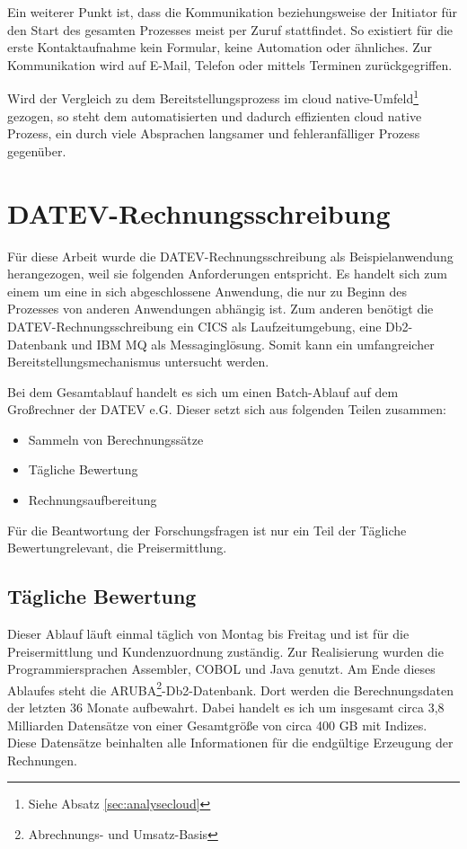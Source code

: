 Ein weiterer Punkt ist, dass die Kommunikation beziehungsweise der Initiator für den Start des gesamten Prozesses meist per Zuruf stattfindet.
So existiert für die erste Kontaktaufnahme kein Formular, keine Automation oder ähnliches.
Zur Kommunikation wird auf E-Mail, Telefon oder mittels Terminen zurückgegriffen.

Wird der Vergleich zu dem Bereitstellungsprozess im cloud native-Umfeld\footnote{Siehe Absatz \ref{sec:analysecloud}} gezogen, so steht dem automatisierten und dadurch effizienten cloud native Prozess, ein durch viele Absprachen langsamer und fehleranfälliger Prozess gegenüber.

\section{DATEV-Rechnungsschreibung}\label{rechBesch}
Für diese Arbeit wurde die DATEV-Rechnungsschreibung als Beispielanwendung herangezogen, weil sie folgenden Anforderungen entspricht.
Es handelt sich zum einem um eine in sich abgeschlossene Anwendung, die nur zu Beginn des Prozesses von anderen Anwendungen abhängig ist.
Zum anderen benötigt die DATEV-Rechnungsschreibung ein CICS als Laufzeitumgebung, eine Db2-Datenbank und IBM MQ als Messaginglösung.
Somit kann ein umfangreicher Bereitstellungsmechanismus untersucht werden.

Bei dem Gesamtablauf handelt es sich um einen Batch-Ablauf auf dem Großrechner der DATEV e.G.
Dieser setzt sich aus folgenden Teilen zusammen:
\begin{itemize}
\item Sammeln von Berechnungssätze
\item Tägliche Bewertung
\item Rechnungsaufbereitung
\end{itemize}
Für die Beantwortung der Forschungsfragen ist nur ein Teil der \glqq Tägliche Bewertung\grqq relevant, die Preisermittlung.

\subsection{Tägliche Bewertung}\label{sssec:täglbew}
Dieser Ablauf läuft einmal täglich von Montag bis Freitag und ist für die Preisermittlung und Kundenzuordnung zuständig.
Zur Realisierung wurden die Programmiersprachen Assembler, COBOL und Java genutzt.
Am Ende dieses Ablaufes steht die ARUBA\footnote{Abrechnungs- und Umsatz-Basis}-Db2-Datenbank.
Dort werden die Berechnungsdaten der letzten 36 Monate aufbewahrt.
Dabei handelt es ich um insgesamt circa 3,8 Milliarden Datensätze von einer Gesamtgröße von circa 400 GB mit Indizes.
Diese Datensätze beinhalten alle Informationen für die endgültige Erzeugung der Rechnungen.

